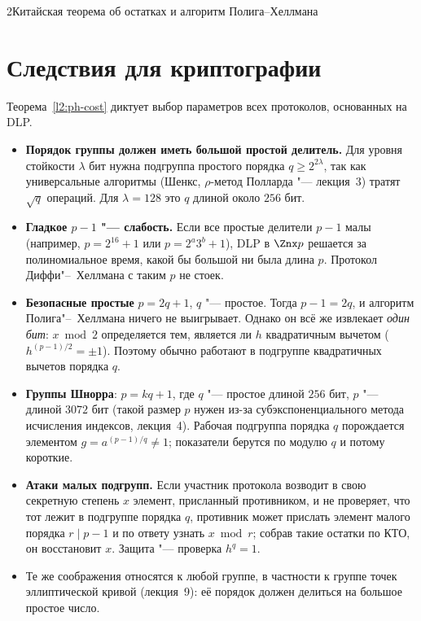 \begin{lecture}{2}{Китайская теорема об остатках и алгоритм Полига–Хеллмана}
\section{Следствия для криптографии}

Теорема~\ref{l2:ph-cost} диктует выбор параметров всех протоколов, основанных на DLP.

\begin{itemize}
  \item \textbf{Порядок группы должен иметь большой простой делитель.} Для уровня стойкости
    $\lambda$ бит нужна подгруппа простого порядка $q \ge 2^{2\lambda}$, так как универсальные
    алгоритмы (Шенкс, $\rho$-метод Полларда "--- лекция~3) тратят $\sqrt q$ операций. Для
    $\lambda = 128$ это $q$ длиной около $256$ бит.
  \item \textbf{Гладкое $p - 1$ "--- слабость.} Если все простые делители $p - 1$ малы (например,
    $p = 2^{16} + 1$ или $p = 2^a 3^b + 1$), DLP в $\Znx p$ решается за полиномиальное время,
    какой бы большой ни была длина $p$. Протокол Диффи"--~Хеллмана с таким $p$ не стоек.
  \item \textbf{Безопасные простые} $p = 2q + 1$, $q$ "--- простое. Тогда $p - 1 = 2q$, и
    алгоритм Полига"--~Хеллмана ничего не выигрывает. Однако он всё же извлекает \emph{один бит}:
    $x \bmod 2$ определяется тем, является ли $h$ квадратичным вычетом ($h^{(p-1)/2} = \pm 1$).
    Поэтому обычно работают в подгруппе квадратичных вычетов порядка $q$.
  \item \textbf{Группы Шнорра}: $p = kq + 1$, где $q$ "--- простое длиной $256$ бит, $p$ "--- длиной
    $3072$ бит (такой размер $p$ нужен из-за субэкспоненциального метода исчисления индексов,
    лекция~4). Рабочая подгруппа порядка $q$ порождается элементом $g = a^{(p-1)/q} \ne 1$;
    показатели берутся по модулю $q$ и потому короткие.
  \item \textbf{Атаки малых подгрупп.} Если участник протокола возводит в свою секретную степень $x$
    элемент, присланный противником, и не проверяет, что тот лежит в подгруппе порядка $q$,
    противник может прислать элемент малого порядка $r \mid p - 1$ и по ответу узнать $x \bmod r$;
    собрав такие остатки по КТО, он восстановит $x$. Защита "--- проверка $h^q = 1$.
  \item Те же соображения относятся к любой группе, в частности к группе точек эллиптической
    кривой (лекция~9): её порядок должен делиться на большое простое число.
\end{itemize}


\end{lecture}
